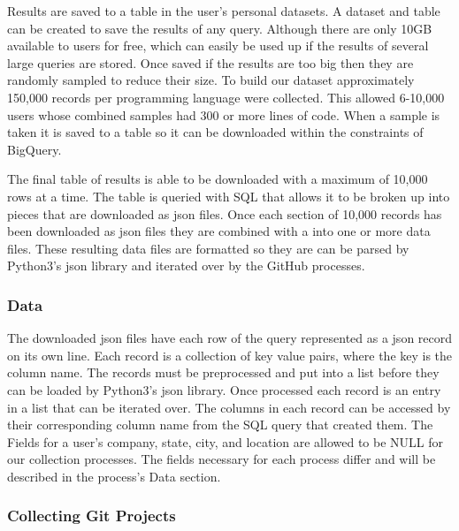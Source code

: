 \documentclass[12pt]{article}
\begin{document}
Results are saved to a table in the user's personal datasets. A dataset and table can be created to save the results of any query. Although there are only 10GB available to users for free, which can easily be used up if the results of several large queries are stored. Once saved if the results are too big then they are randomly sampled to reduce their size. To build our dataset approximately 150,000 records per programming language were collected. This allowed 6-10,000 users whose combined samples had 300 or more lines of code. When a sample is taken it is saved to a table so it can be downloaded within the constraints of BigQuery.

The final table of results is able to be downloaded with a maximum of 10,000 rows at a time. The table is queried with SQL that allows it to be broken up into pieces that are downloaded as json files. Once each section of 10,000 records has been downloaded as json files they are combined with a into one or more data files. These resulting data files are formatted so they are can be parsed by Python3's json library and iterated over by the GitHub processes.

\subsubsection*{Data}
The downloaded json files have each row of the query represented as a json record on its own line. Each record is a collection of key value pairs, where the key is the column name. The records must be preprocessed and put into a list before they can be loaded by Python3's json library. Once processed each record is an entry in a list that can be iterated over. The columns in each record can be accessed by their corresponding column name from the SQL query that created them. The Fields for a user's company, state, city, and location are allowed to be NULL for our collection processes. The fields necessary for each process differ and will be described in the process's Data section.

\subsubsection{Collecting Git Projects}
\end{document}

